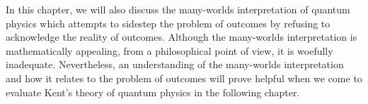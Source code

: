 In this chapter, we will also discuss the many-worlds interpretation of quantum physics which attempts to sidestep the problem of outcomes by refusing to acknowledge the reality of outcomes. Although the many-worlds interpretation is mathematically appealing, from a philosophical point of view, it is woefully inadequate. Nevertheless, an understanding of the many-worlds interpretation and how it relates to the problem of outcomes will prove helpful when we come to evaluate Kent's theory of quantum physics in the following chapter. 